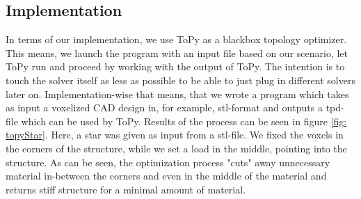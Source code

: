 \subsection{Implementation}
In terms of our implementation, we use ToPy as a blackbox topology optimizer. This means, we launch the program with an input file based on our scenario, let ToPy run and proceed by working with the output of ToPy. The intention is to touch the solver itself as less as possible to be able to just plug in different solvers later on. Implementation-wise that means, that we wrote a program which takes as input a voxelized CAD design in, for example, stl-format and outputs a tpd-file which can be used by ToPy. Results of the process can be seen in figure \ref{fig: topyStar}. Here, a star was given as input from a stl-file. We fixed the voxels in the corners of the structure, while we set a load in the middle, pointing into the structure. As can be seen, the optimization process "cuts" away unnecessary material in-between the corners and even in the middle of the material and returns stiff structure for a minimal amount of material. 
